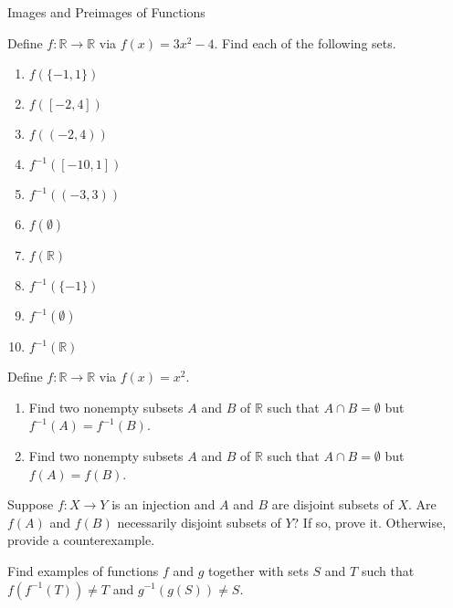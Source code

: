 \begin{section}{Images and Preimages of Functions}
\begin{problem}
Define $f:\mathbb{R}\to\mathbb{R}$ via $f(x)=3x^2-4$.
Find each of the following sets.
\begin{enumerate}[label=\textrm{(\alph*)}]
\item $f(\{-1,1\})$
\item $f([-2,4])$
\item $f((-2,4))$
\item $f^{-1}([-10,1])$
\item $f^{-1}((-3,3))$
\item $f(\emptyset)$
\item $f(\mathbb{R})$
\item $f^{-1}(\{-1\})$
\item $f^{-1}(\emptyset)$
\item $f^{-1}(\mathbb{R})$
\end{enumerate}
\end{problem}

\begin{problem}
Define $f:\mathbb{R}\to\mathbb{R}$ via $f(x)=x^2$.
\begin{enumerate}[label=\textrm{(\alph*)}]
\item Find two nonempty subsets $A$ and $B$ of $\mathbb{R}$ such that $A\cap B=\emptyset$ but $f^{-1}(A)=f^{-1}(B)$.
\item Find two nonempty subsets $A$ and $B$ of $\mathbb{R}$ such that $A\cap B=\emptyset$ but $f(A)=f(B)$.
\end{enumerate}
\end{problem}

\begin{problem}
Suppose $f:X\to Y$ is an injection and $A$ and $B$ are disjoint subsets of $X$. Are $f(A)$ and $f(B)$ necessarily disjoint subsets of $Y$?  If so, prove it. Otherwise, provide a counterexample.
\end{problem}

\begin{problem}
Find examples of functions $f$ and $g$ together with sets $S$ and $T$ such that $f(f^{-1}(T))\neq T$ and $g^{-1}(g(S))\neq S$.
\end{problem}


\end{section}
